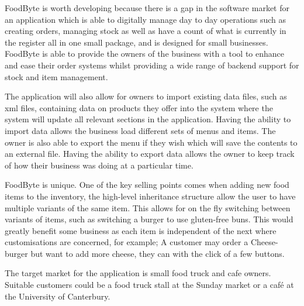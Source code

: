 FoodByte is worth developing because there is a gap in the software market for an application which is able to digitally manage day to day operations such as creating orders, managing stock as well as have a count of what is currently in the register all in one small package, and is designed for small businesses. FoodByte is able to provide the owners of the business with a tool to enhance and ease their order systems whilst providing a wide range of backend support for stock and item management.

The application will also allow for owners to import existing data files, such as xml files, containing data on products they offer into the system where the system will update all relevant sections in the application. Having the ability to import data allows the business load different sets of menus and items. The owner is also able to export the menu if they wish which will save the contents to an external file. Having the ability to export data allows the owner to keep track of how their business was doing at a particular time.

FoodByte is unique. One of the key selling points comes when adding new food items to the inventory, the high-level inheritance structure allow the user to have multiple variants of the same item. This allows for on the fly switching between variants of items, such as switching a burger to use gluten-free buns. This would greatly benefit some business as each item is independent of the next where customisations are concerned, for example; A customer may order a Cheese-burger but want to add more cheese, they can with the click of a few buttons.

The target market for the application is small food truck and cafe owners. Suitable customers could be a food truck stall at the Sunday market or a café at the University of Canterbury.